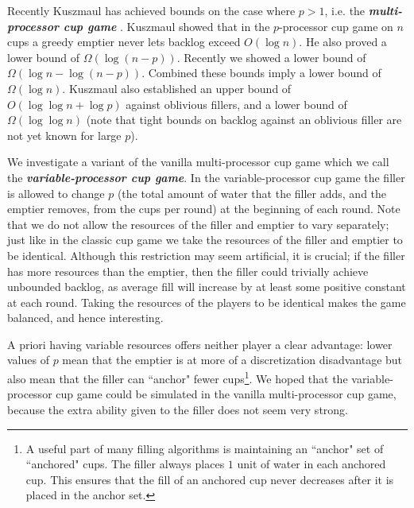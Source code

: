\documentclass[twocolumn]{article}[10pt]
\newcommand{\defn}[1]{{\textit{\textbf{\boldmath #1}}}\xspace}
\renewcommand{\paragraph}[1]{\vspace{0.09in}\noindent{\bf \boldmath #1.}}
\begin{document}
Recently Kuszmaul has achieved bounds on the case where $p>1$, i.e. the
\defn{multi-processor cup game} \cite{wku20}. Kuszmaul showed that in the 
$p$-processor cup game on $n$ cups a greedy emptier never lets backlog exceed
$O(\log n)$. He also proved a lower bound of $\Omega(\log (n-p))$. Recently we
showed a lower bound of $\Omega(\log n - \log (n-p))$. Combined these bounds
imply a lower bound of $\Omega(\log n)$.
Kuszmaul also established an upper bound of $O(\log\log n + \log p)$ against
oblivious fillers, and a lower bound of $\Omega(\log\log n)$ (note that tight
bounds on backlog against an oblivious filler are not yet known for large $p$).

\paragraph{Our Variant}
We investigate a variant of the vanilla multi-processor cup game which we call
the \defn{variable-processor cup game}. In the variable-processor cup game the
filler is allowed to change $p$ (the total amount of water that the filler
adds, and the emptier removes, from the cups per round) at the beginning of
each round. Note that we do not allow the resources of the filler and emptier
to vary separately; just like in the classic cup game we take the resources of
the filler and emptier to be identical.
Although this restriction may seem artificial, it is crucial; if
the filler has more resources than the emptier, then
the filler could trivially achieve unbounded backlog, as average fill will
increase by at least some positive constant at each round.
Taking the resources of the players to be identical makes the game balanced,
and hence interesting.

A priori having variable resources offers neither player a clear advantage:
lower values of $p$ mean that the emptier is at more of a discretization
disadvantage but also mean that the filler can ``anchor" fewer cups\footnote{A
useful part of many filling algorithms is maintaining an ``anchor" set of
``anchored" cups. The filler always places $1$ unit of water in each anchored
cup. This ensures that the fill of an anchored cup never decreases after it is
placed in the anchor set.}. We hoped that the variable-processor cup game could
be simulated in the vanilla multi-processor cup game, because the extra
ability given to the filler does not seem very strong. 
\end{document}
